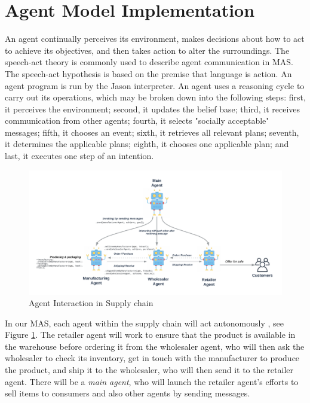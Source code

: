 \section{Agent Model Implementation}

An agent continually perceives its environment, makes decisions about how to act to achieve its objectives, and then takes action to alter the surroundings. The speech-act theory is commonly used to describe agent communication in \ac{MAS}. The speech-act hypothesis is based on the premise that language is action. An agent program is run by the Jason interpreter. An agent uses a reasoning cycle to carry out its operations, which may be broken down into the following steps: first, it perceives the environment; second, it updates the belief base; third, it receives communication from other agents; fourth, it selects "socially acceptable" messages; fifth, it chooses an event; sixth, it retrieves all relevant plans; seventh, it determines the applicable plans; eighth, it chooses one applicable plan; and last, it executes one step of an intention.

\begin{figure}[h!]
    \centering
      \includegraphics[width=\linewidth]{includes/figures/agent.png} 
      \caption{Agent Interaction in Supply chain}
      \label{Agent Interaction}
    \end{figure}
  
\vspace{.5cm}

In our \ac{MAS}, each agent within the supply chain will act autonomously , see Figure \ref{Agent Interaction}. The retailer agent will work to ensure that the product is available in the warehouse before ordering it from the wholesaler agent, who will then ask the wholesaler to check its inventory, get in touch with the manufacturer to produce the product, and ship it to the wholesaler, who will then send it to the retailer agent. There will be a \textit{main agent}, who will launch the retailer agent's efforts to sell items to consumers and also other agents by sending messages.

